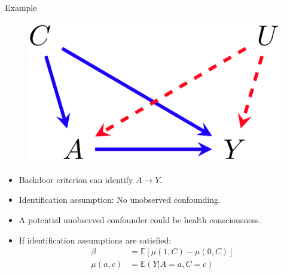 \documentclass{beamer}
\begin{document}
\begin{frame}{Example}
	\begin{figure}
		\center
		\includegraphics[scale=0.2]{m1.png}
	\end{figure}
	\vspace{1em}
	\begin{itemize}
		\item Backdoor criterion can identify $ A \rightarrow Y $.
		\item Identification assumption: No unobserved confounding.
		\item A potential unobserved confounder could be health consciousness.
		\item If identification assumptions are satisfied:
		\begin{equation*}
				\begin{split}
					\beta &= \mathbb{E}[\mu(1, C) - \mu(0, C)] \\
					\mu(a, c) &= \mathbb{E}(Y | A=a, C=c)
				\end{split}
			\end{equation*}

	\end{itemize}
\end{frame}
\end{document}
